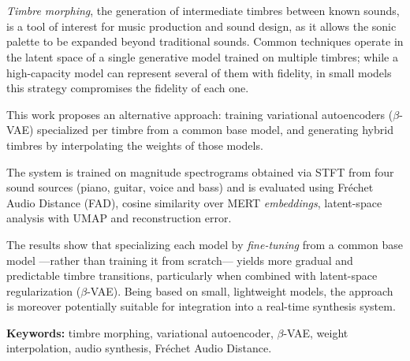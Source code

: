 \chapter*{\runtitle}

\noindent \emph{Timbre morphing}, the generation of intermediate timbres
between known sounds, is a tool of interest for music production
and sound design, as it allows the sonic palette to be expanded beyond
traditional sounds. Common techniques operate in the latent space
of a single generative model trained on multiple timbres; while a
high-capacity model can represent several of them with fidelity, in small
models this strategy compromises the fidelity of each one.

This work proposes an alternative approach: training variational
autoencoders ($\beta$-VAE) specialized per timbre from a common base
model, and generating hybrid timbres by interpolating the weights of those
models.

The system is trained on magnitude spectrograms obtained via STFT
from four sound sources (piano, guitar, voice and bass) and is evaluated
using Fréchet Audio Distance (FAD), cosine similarity over MERT
\emph{embeddings}, latent-space analysis with UMAP and reconstruction
error.

The results show that specializing each model by \emph{fine-tuning} from a
common base model —rather than training it from scratch— yields more gradual
and predictable timbre transitions, particularly when combined with
latent-space regularization ($\beta$-VAE). Being based on small, lightweight
models, the approach is moreover potentially suitable for integration into a
real-time synthesis system.

\bigskip

\noindent\textbf{Keywords:} timbre morphing, variational autoencoder,
$\beta$-VAE, weight interpolation, audio synthesis, Fréchet Audio
Distance.
